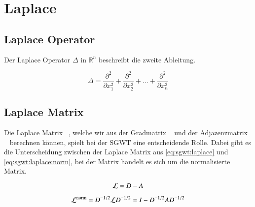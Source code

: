 
\section{Laplace\label{sec:sgwt:laplace}}

\subsection{Laplace Operator\label{subsec:sgwt:laplaceop}}

Der Laplace Operator $\Delta$ in $\mathbb{R}^n$ beschreibt die zweite Ableitung.

\begin{equation}
\Delta = \frac{\partial^2}{\partial x_1^2}
+ \frac{\partial^2}{\partial x_2^2}
+ \dots
+ \frac{\partial^2}{\partial x_n^2}
\end{equation}

\subsection{Laplace Matrix\label{subsec:sgwt:laplacm}}


Die Laplace Matrix 
\laplaceL~\cite{noauthor_laplace-matrix_2017}, welche wir aus der 
Gradmatrix \degreeM~\cite{noauthor_degree_2018} und der Adjazenzmatrix 
\adjacencyM~\cite{noauthor_adjacency_2019} berechnen k\"onnen, spielt bei der 
SGWT eine entscheidende Rolle. Dabei gibt es 
die Unterscheidung zwischen der Laplace Matrix aus \cref{eq:sgwt:laplace} und 
\cref{eq:sgwt:laplace:norm}, bei der \laplaceLnorm{} Matrix handelt es sich um 
die normalisierte \laplaceL{} Matrix.

\begin{equation}
\laplaceL = \degreeM - \adjacencyM
\label{eq:sgwt:laplace}
\end{equation}

\begin{equation}
\laplaceLnorm
= \degreeM^{-1/2}\laplaceL\degreeM^{-1/2}
= I - \degreeM^{-1/2}\adjacencyM\degreeM^{-1/2}
\label{eq:sgwt:laplace:norm}
\end{equation}

